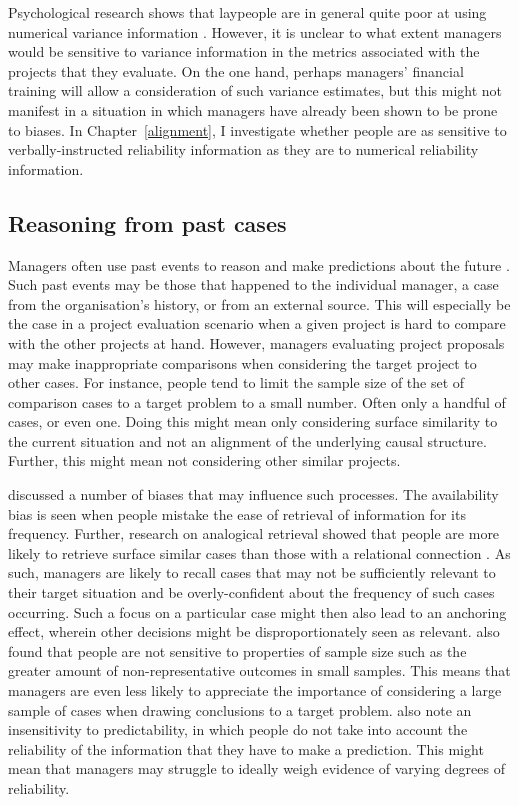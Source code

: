 \documentclass[a4paper, nobind, dvipsnames]{templates/ociamthesis}
\theoremstyle{definition}
\theoremstyle{definition}
\theoremstyle{definition}
\theoremstyle{definition}
\theoremstyle{remark}
\begin{document}
Psychological research shows that laypeople are in general quite poor at using
numerical variance information \autocite{galesic2010,konold1993,vivalt2018,batteux2020}. However, it is unclear to what extent managers would be sensitive
to variance information in the metrics associated with the projects that they
evaluate. On the one hand, perhaps managers' financial training will allow a
consideration of such variance estimates, but this might not manifest in a
situation in which managers have already been shown to be prone to biases. In
Chapter~\ref{alignment}, I investigate whether people are as sensitive to
verbally-instructed reliability information as they are to numerical reliability
information.

\subsection{Reasoning from past cases}

Managers often use past events to reason and make predictions about the future
\autocite{einhorn1987}. Such past events may be those that happened to the individual
manager, a case from the organisation's history, or from an external source.
This will especially be the case in a project evaluation scenario when a given
project is hard to compare with the other projects at hand. However, managers
evaluating project proposals may make inappropriate comparisons when considering
the target project to other cases. For instance, people tend to limit the sample
size of the set of comparison cases to a target problem to a small number. Often
only a handful of cases, or even one. Doing this might mean only considering
surface similarity to the current situation and not an alignment of the
underlying causal structure. Further, this might mean not considering other
similar projects.

\textcite{tversky1974} discussed a number of biases that may influence such processes. The
availability bias is seen when people mistake the ease of retrieval of
information for its frequency. Further, research on analogical retrieval showed
that people are more likely to retrieve surface similar cases than those with a
relational connection \autocite{gentner1993}. As such, managers are likely to recall
cases that may not be sufficiently relevant to their target situation and be
overly-confident about the frequency of such cases occurring. Such a focus on a
particular case might then also lead to an anchoring effect, wherein other
decisions might be disproportionately seen as relevant. \textcite{tversky1974} also found
that people are not sensitive to properties of sample size such as the greater
amount of non-representative outcomes in small samples. This means that managers
are even less likely to appreciate the importance of considering a large sample
of cases when drawing conclusions to a target problem. \textcite{tversky1974} also note an
insensitivity to predictability, in which people do not take into account the
reliability of the information that they have to make a prediction. This might
mean that managers may struggle to ideally weigh evidence of varying degrees of
reliability.
\end{document}
